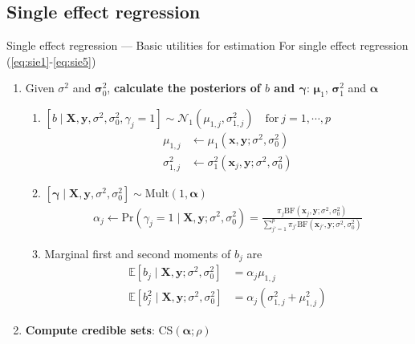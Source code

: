 \documentclass[10pt]{beamer}
\begin{document}
\subsection{Single effect regression}
    
\begin{frame}[allowframebreaks]{Single effect regression --- \normalsize Basic utilities for estimation}
    For single effect regression (\ref{eq:sie1}-\ref{eq:sie5})
    \begin{enumerate}
        \item Given $\sigma^2$ and $\bm{\sigma}_0^2$, \textbf{calculate the posteriors of $b$ and $\bm{\gamma}$}: $\bm{\mu}_1$, $\bm{\sigma}_1^2$ and $\bm{\alpha}$
        \begin{enumerate}
            \item $[b\mid\bm{X},\bm{y},\sigma^2,\sigma_0^2,\gamma_j=1] \sim\mathcal{N}_1(\mu_{1,j},\sigma_{1,j}^2)\quad\text{for}\ j=1,\cdots,p$
            \begin{align}
                \mu_{1,j} & \gets \mu_1(\bm{x},\bm{y};\sigma^2,\sigma_0^2) \\
                \sigma^2_{1,j} & \gets \sigma^2_1(\bm{x}_j,\bm{y};\sigma^2,\sigma_0^2)
            \end{align}
            
            \item $[\bm{\gamma}\mid\bm{X},\bm{y},\sigma^2,\sigma^2_0] \sim\text{Mult}(1,\bm{\alpha})$
            \begin{gather}
                \alpha_j 
                 \gets \text{Pr}(\gamma_j=1\mid\bm{X},\bm{y};\sigma^2,\sigma_0^2) = \frac{\pi_j\text{BF}(\bm{x}_j,\bm{y};\sigma^2,\sigma_0^2)}{\sum_{j'=1}^p\pi_{j'}\text{BF}(\bm{x}_{j'},\bm{y};\sigma^2,\sigma_0^2)}\label{eq:alphapost}
            \end{gather}
        
            \item Marginal first and second moments of $b_j$ are
            \begin{align}
                \mathbb{E}[b_j\mid\bm{X},\bm{y};\sigma^2,\sigma_0^2] & = \alpha_j\mu_{1,j} \\
                \mathbb{E}[b_j^2\mid\bm{X},\bm{y};\sigma^2,\sigma_0^2] & = \alpha_j(\sigma_{1,j}^2 + \mu_{1,j}^2)
            \end{align}
        \end{enumerate}
        
        \item \textbf{Compute credible sets}: $\text{CS}(\bm{\alpha};\rho)$
        

\end{enumerate}
\end{frame}
\end{document}
